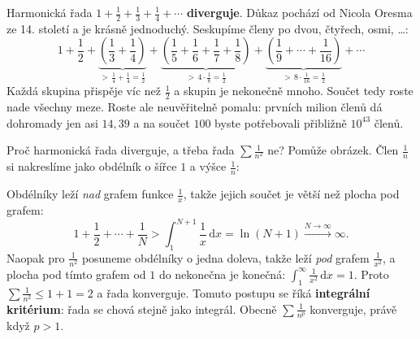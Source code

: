 \begin{example}
  Harmonická řada $1 + \frac{1}{2} + \frac{1}{3} + \frac{1}{4} + \cdots$ \textbf{diverguje}. Důkaz pochází od Nicola Oresma ze 14. století a je krásně jednoduchý. Seskupíme členy po dvou, čtyřech, osmi, \dots:
  \begin{equation*}
    1 + \frac{1}{2} + \underbrace{\left(\frac{1}{3} + \frac{1}{4}\right)}_{>\,\frac{1}{4} + \frac{1}{4} = \frac{1}{2}} + \underbrace{\left(\frac{1}{5} + \frac{1}{6} + \frac{1}{7} + \frac{1}{8}\right)}_{>\,4\cdot\frac{1}{8} = \frac{1}{2}} + \underbrace{\left(\frac{1}{9} + \cdots + \frac{1}{16}\right)}_{>\,8\cdot\frac{1}{16} = \frac{1}{2}} + \cdots
  \end{equation*}
  Každá skupina přispěje víc než $\frac{1}{2}$ a skupin je nekonečně mnoho. Součet tedy roste nade všechny meze. Roste ale neuvěřitelně pomalu: prvních milion členů dá dohromady jen asi $14{,}39$ a na součet $100$ byste potřebovali přibližně $10^{43}$ členů.
\end{example}

Proč harmonická řada diverguje, a třeba řada $\sum\frac{1}{n^2}$ ne? Pomůže obrázek. Člen $\frac{1}{n}$ si nakreslíme jako obdélník o šířce $1$ a výšce $\frac{1}{n}$:

\begin{center}
\end{center}

Obdélníky leží \textit{nad} grafem funkce $\frac{1}{x}$, takže jejich součet je větší než plocha pod grafem:
\begin{equation*}
  1 + \frac{1}{2} + \cdots + \frac{1}{N} > \int_1^{N+1}\frac{1}{x}\,\mathrm{d}x = \ln(N + 1)\xrightarrow{N\to\infty}\infty.
\end{equation*}
Naopak pro $\frac{1}{n^2}$ posuneme obdélníky o jedna doleva, takže leží \textit{pod} grafem $\frac{1}{x^2}$, a plocha pod tímto grafem od $1$ do nekonečna je konečná: $\int_1^{\infty}\frac{1}{x^2}\,\mathrm{d}x = 1$. Proto $\sum\frac{1}{n^2}\leq 1 + 1 = 2$ a řada konverguje. Tomuto postupu se říká \textbf{integrální kritérium}: řada se chová stejně jako integrál. Obecně $\sum\frac{1}{n^p}$ konverguje, právě když $p > 1$.

